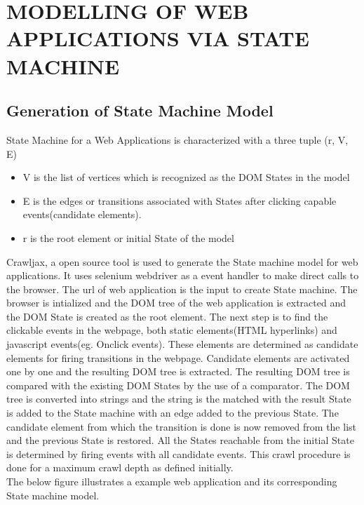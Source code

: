 
\chapter{MODELLING OF WEB APPLICATIONS VIA STATE MACHINE}

\section{Generation of State Machine Model}

 State Machine for a Web Applications is characterized with a three tuple (r, V, E)
 \begin{itemize}
     \item V is the list of vertices which is recognized as the DOM States in the model
     \item E is the edges or transitions associated with States after clicking capable events(candidate elements).
     \item r is the root element or initial State of the model 
 \end{itemize}
 
Crawljax, a open source tool is used to generate the State machine model for web applications. It uses selenium webdriver as a event handler to make direct calls to the browser. The url of web application is the input to create State machine. The browser is intialized and the DOM tree of the web application is extracted and the DOM State is created as the root element. The next step is to find the clickable events in the webpage, both static elements(HTML hyperlinks) and javascript events(eg. Onclick events). These elements are determined as candidate elements for firing transitions in the webpage. Candidate elements are activated one by one and the resulting DOM tree is extracted. The resulting DOM tree is compared with the existing DOM States by the use of a comparator. The DOM tree is converted into strings and the string is the matched with the result State is added to the State machine with an edge added to the previous State. The candidate element from which the transition is done is now removed from the list and the previous State is restored. All the States reachable from the initial State is determined by firing events with all candidate events. This crawl procedure is done for a maximum crawl depth as defined initially.\\
\newline
The below figure illustrates a example web application and its corresponding State machine model.

